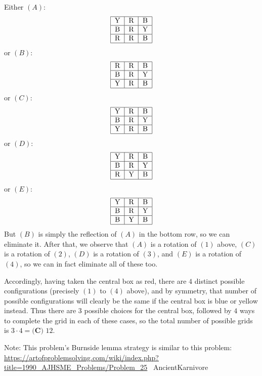 \begin{enumerate}
 Either $(A)$:
 \[\begin{tabular}{|c|c|c|} \hline Y & R & B \\ \hline B & R & Y \\ \hline R & R & B \\ \hline \end{tabular}\]or $(B)$:
 \[\begin{tabular}{|c|c|c|} \hline R & R & B \\ \hline B & R & Y \\ \hline Y & R & B \\ \hline \end{tabular}\]or $(C)$:
 \[\begin{tabular}{|c|c|c|} \hline Y & R & B \\ \hline B & R & Y \\ \hline Y & R & B \\ \hline \end{tabular}\]or $(D)$:
 \[\begin{tabular}{|c|c|c|} \hline Y & R & B \\ \hline B & R & Y \\ \hline R & Y & B \\ \hline \end{tabular}\]or $(E)$:
 \[\begin{tabular}{|c|c|c|} \hline Y & R & B \\ \hline B & R & Y \\ \hline B & Y & B \\ \hline \end{tabular}\]But $(B)$ is simply the reflection of $(A)$ in the bottom row, so we can eliminate it. After that, we observe that $(A)$ is a rotation of $(1)$ above, $(C)$ is a rotation of $(2)$, $(D)$ is a rotation of $(3)$, and $(E)$ is a rotation of $(4)$, so we can in fact eliminate all of these too.

 Accordingly, having taken the central box as red, there are $4$ distinct possible configurations (precisely $(1)$ to $(4)$ above), and by symmetry, that number of possible configurations will clearly be the same if the central box is blue or yellow instead. Thus there are $3$ possible choices for the central box, followed by $4$ ways to complete the grid in each of these cases, so the total number of possible grids is $3 \cdot 4 = \boxed{\textbf{(C) } 12}$.

 Note: This problem's Burnside lemma strategy is similar to this problem: \href{https://artofproblemsolving.com/wiki/index.php?title=1990\_AJHSME\_Problems/Problem\_25}{https://artofproblemsolving.com/wiki/index.php?title=1990\_AJHSME\_Problems/Problem\_25} ~AncientKarnivore


\end{enumerate}
